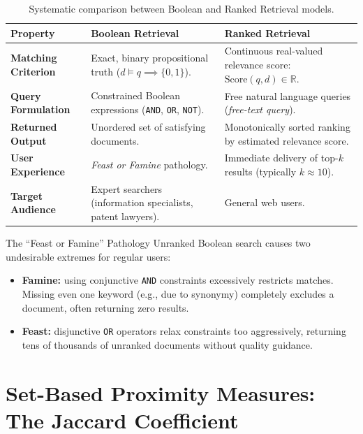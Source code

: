 \begin{table}[H]
\centering
\small
\begin{tabularx}{\linewidth}{l Y Y}
\toprule
\textbf{Property} & \textbf{Boolean Retrieval} & \textbf{Ranked Retrieval} \\
\midrule
\textbf{Matching Criterion} & Exact, binary propositional truth ($d \models q \implies \{0, 1\}$). & Continuous real-valued relevance score: $\text{Score}(q, d) \in \mathbb{R}$. \\
\addlinespace
\textbf{Query Formulation} & Constrained Boolean expressions (\texttt{AND}, \texttt{OR}, \texttt{NOT}). & Free natural language queries (\textit{free-text query}). \\
\addlinespace
\textbf{Returned Output} & Unordered set of satisfying documents. & Monotonically sorted ranking by estimated relevance score. \\
\addlinespace
\textbf{User Experience} & \textit{Feast or Famine} pathology. & Immediate delivery of top-$k$ results (typically $k \approx 10$). \\
\addlinespace
\textbf{Target Audience} & Expert searchers (information specialists, patent lawyers). & General web users. \\
\bottomrule
\end{tabularx}
\caption{Systematic comparison between Boolean and Ranked Retrieval models.}
\label{tab:boolean-vs-ranked-en}
\end{table}

\begin{noteblock}{The ``Feast or Famine'' Pathology}
Unranked Boolean search causes two undesirable extremes for regular users:
\begin{itemize}
    \item \textbf{Famine:} using conjunctive \texttt{AND} constraints excessively restricts matches. Missing even one keyword (e.g., due to synonymy) completely excludes a document, often returning zero results.
    \item \textbf{Feast:} disjunctive \texttt{OR} operators relax constraints too aggressively, returning tens of thousands of unranked documents without quality guidance.
\end{itemize}
\end{noteblock}

\FloatBarrier
\section{Set-Based Proximity Measures: The Jaccard Coefficient}
\label{sec:jaccard-coefficient-en}
\label{sec:jaccard-scoring-en}

